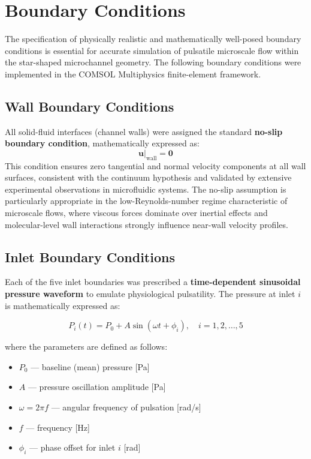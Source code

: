 \documentclass[12pt,a4paper]{article}
\begin{document}
\section{Boundary Conditions}

The specification of physically realistic and mathematically well-posed boundary conditions is essential for accurate simulation of pulsatile microscale flow within the star-shaped microchannel geometry. The following boundary conditions were implemented in the COMSOL Multiphysics finite-element framework.

\subsection{Wall Boundary Conditions}

All solid-fluid interfaces (channel walls) were assigned the standard \textbf{no-slip boundary condition}, mathematically expressed as:
\begin{equation}
\mathbf{u}|_{\text{wall}} = \mathbf{0}
\end{equation}
This condition ensures zero tangential and normal velocity components at all wall surfaces, consistent with the continuum hypothesis and validated by extensive experimental observations in microfluidic systems. The no-slip assumption is particularly appropriate in the low-Reynolds-number regime characteristic of microscale flows, where viscous forces dominate over inertial effects and molecular-level wall interactions strongly influence near-wall velocity profiles.

\subsection{Inlet Boundary Conditions}

Each of the five inlet boundaries was prescribed a \textbf{time-dependent sinusoidal pressure waveform} to emulate physiological pulsatility. The pressure at inlet $i$ is mathematically expressed as:

\begin{equation}
P_i(t) = P_0 + A \sin(\omega t + \phi_i), \quad i = 1, 2, \ldots, 5
\label{eq:inlet_pressure}
\end{equation}

where the parameters are defined as follows:
\begin{itemize}
  \item $P_0$ --- baseline (mean) pressure [Pa]
  \item $A$ --- pressure oscillation amplitude [Pa]
  \item $\omega = 2\pi f$ --- angular frequency of pulsation [rad/s]
  \item $f$ --- frequency [Hz]
  \item $\phi_i$ --- phase offset for inlet $i$ [rad]
\end{itemize}
\end{document}
